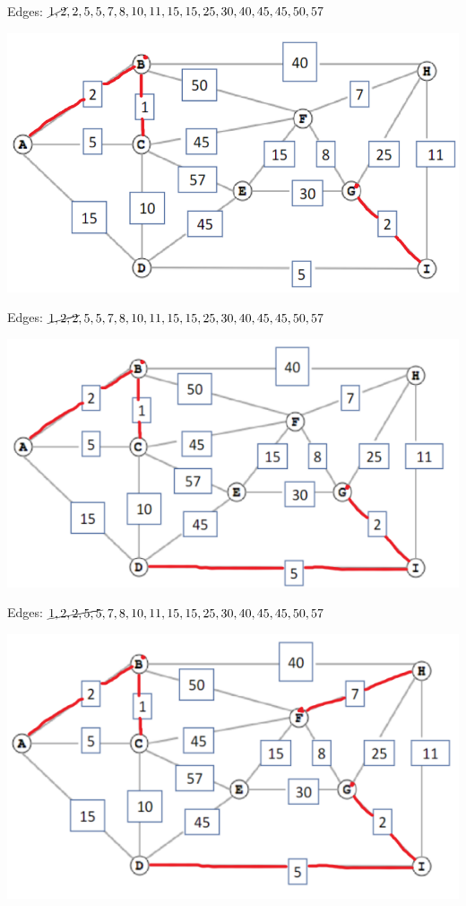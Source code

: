 \documentclass[11pt]{article}
\begin{document}
\begin{itemize}
	Edges: $\cancel{1,2},2,5,5,7,8,10,11,15,15,25,30,40,45,45,50,57$

	\includegraphics[width=\textwidth]{3.png}

	Edges: $\cancel{1,2,2},5,5,7,8,10,11,15,15,25,30,40,45,45,50,57$

	\includegraphics[width=\textwidth]{4.png}

	Edges: $\cancel{1,2,2,5,5},7,8,10,11,15,15,25,30,40,45,45,50,57$

	\includegraphics[width=\textwidth]{5.png}


\end{itemize}
\end{document}
